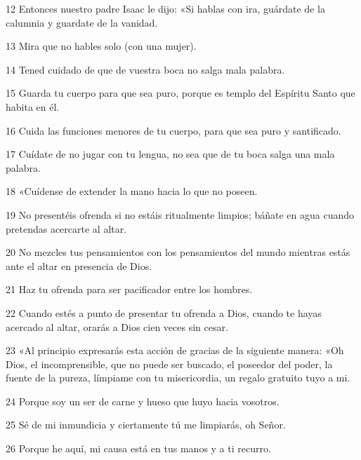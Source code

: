 \par 12 Entonces nuestro padre Isaac le dijo: «Si hablas con ira, guárdate de la calumnia y guardate de la vanidad.

\par 13 Mira que no hables solo (con una mujer).

\par 14 Tened cuidado de que de vuestra boca no salga mala palabra.

\par 15 Guarda tu cuerpo para que sea puro, porque es templo del Espíritu Santo que habita en él.

\par 16 Cuida las funciones menores de tu cuerpo, para que sea puro y santificado.

\par 17 Cuídate de no jugar con tu lengua, no sea que de tu boca salga una mala palabra.

\par 18 «Cuídense de extender la mano hacia lo que no poseen.

\par 19 No presentéis ofrenda si no estáis ritualmente limpios; báñate en agua cuando pretendas acercarte al altar.

\par 20 No mezcles tus pensamientos con los pensamientos del mundo mientras estás ante el altar en presencia de Dios.

\par 21 Haz tu ofrenda para ser pacificador entre los hombres.

\par 22 Cuando estés a punto de presentar tu ofrenda a Dios, cuando te hayas acercado al altar, orarás a Dios cien veces sin cesar.

\par 23 «Al principio expresarás esta acción de gracias de la siguiente manera: «Oh Dios, el incomprensible, que no puede ser buscado, el poseedor del poder, la fuente de la pureza, límpiame con tu misericordia, un regalo gratuito tuyo a mi.

\par 24 Porque soy un ser de carne y hueso que huyo hacia vosotros.

\par 25 Sé de mi inmundicia y ciertamente tú me limpiarás, oh Señor.

\par 26 Porque he aquí, mi causa está en tus manos y a ti recurro.

